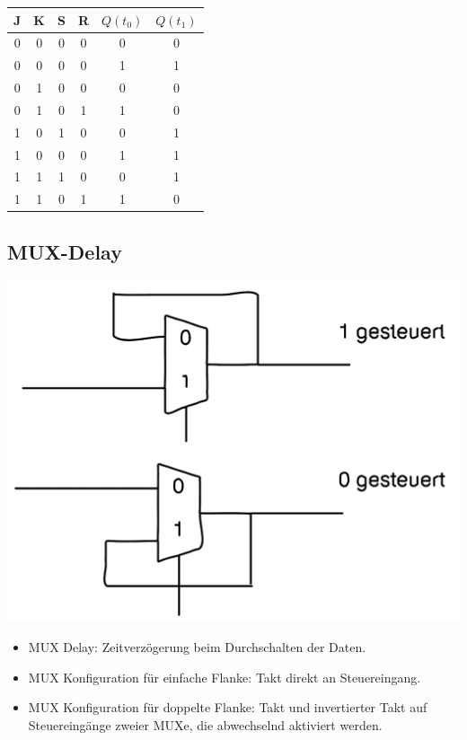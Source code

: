 \documentclass[a4paper,6pt]{article}
\begin{document}
\begin{multicols*}{3}
\begin{center}
    \begin{tabular}{|c|c|c|c||c|c|}
    \hline
    J & K & S & R & $Q(t_0)$ & $Q(t_1)$ \\ \hline
    0 & 0 & 0 & 0 & 0 & 0 \\ \hline
    0 & 0 & 0 & 0 & 1 & 1 \\ \hline
    0 & 1 & 0 & 0 & 0 & 0 \\ \hline
    0 & 1 & 0 & 1 & 1 & 0 \\ \hline
    1 & 0 & 1 & 0 & 0 & 1 \\ \hline
    1 & 0 & 0 & 0 & 1 & 1 \\ \hline
    1 & 1 & 1 & 0 & 0 & 1 \\ \hline
    1 & 1 & 0 & 1 & 1 & 0 \\ \hline
    \end{tabular}
\end{center}

\subsection*{MUX-Delay}

\begin{center}
    \includegraphics[width=0.75\linewidth]{resources/MUX_delay.png}
\end{center}

\begin{itemize}
    \item MUX Delay: Zeitverzögerung beim Durchschalten der Daten.
    \item MUX Konfiguration für einfache Flanke: Takt direkt an Steuereingang.
    \item MUX Konfiguration für doppelte Flanke: Takt und invertierter Takt auf Steuereingänge zweier MUXe, die abwechselnd aktiviert werden.
\end{itemize}


\end{multicols*}
\end{document}
